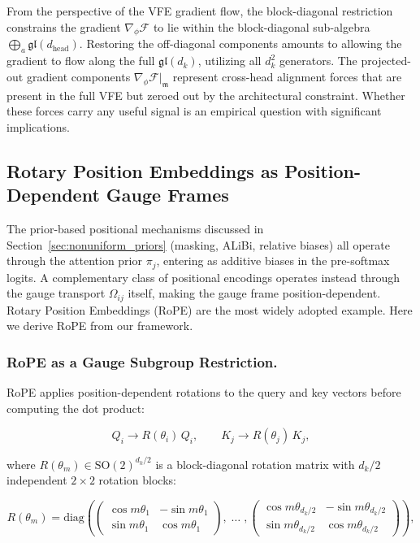 \documentclass[twoside,11pt]{article}
\begin{document}
From the perspective of the VFE gradient flow, the block-diagonal restriction constrains the gradient $\nabla_\phi \mathcal{F}$ to lie within the block-diagonal sub-algebra $\bigoplus_a \mathfrak{gl}(d_{\text{head}})$. Restoring the off-diagonal components amounts to allowing the gradient to flow along the full $\mathfrak{gl}(d_k)$, utilizing all $d_k^2$ generators. The projected-out gradient components $\nabla_\phi \mathcal{F}\big|_{\mathfrak{m}}$ represent cross-head alignment forces that are present in the full VFE but zeroed out by the architectural constraint. Whether these forces carry any useful signal is an empirical question with significant implications.



\subsection{Rotary Position Embeddings as Position-Dependent Gauge Frames}
\label{sec:rope}

The prior-based positional mechanisms discussed in Section~\ref{sec:nonuniform_priors} (masking, ALiBi, relative biases) all operate through the attention prior $\pi_j$, entering as additive biases in the pre-softmax logits. A complementary class of positional encodings operates instead through the gauge transport $\Omega_{ij}$ itself, making the gauge frame position-dependent. Rotary Position Embeddings (RoPE) \citep{su2024roformer} are the most widely adopted example. Here we derive RoPE from our framework.

\subsubsection{RoPE as a Gauge Subgroup Restriction.}

RoPE applies position-dependent rotations to the query and key vectors before computing the dot product:

\begin{equation}
Q_i \to R(\theta_i)\, Q_i, \qquad K_j \to R(\theta_j)\, K_j,
\end{equation}

where $R(\theta_m) \in \mathrm{SO}(2)^{d_k/2}$ is a block-diagonal rotation matrix with $d_k/2$ independent $2\times 2$ rotation blocks:

\begin{equation}
R(\theta_m) = \mathrm{diag}\!\left(
\begin{pmatrix} \cos m\theta_1 & -\sin m\theta_1 \\ \sin m\theta_1 & \cos m\theta_1 \end{pmatrix},
\;\ldots\;,
\begin{pmatrix} \cos m\theta_{d_k/2} & -\sin m\theta_{d_k/2} \\ \sin m\theta_{d_k/2} & \cos m\theta_{d_k/2} \end{pmatrix}
\right),
\label{eq:rope_rotation}
\end{equation}
\end{document}
